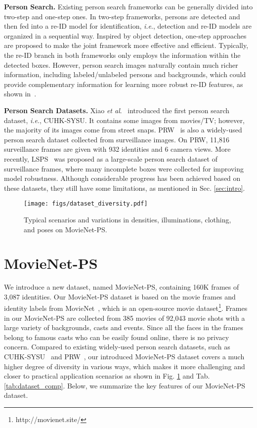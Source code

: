 \documentclass{article}
\def\ie{\emph{i.e}.} \def\Ie{\emph{I.e}.}
\def\etal{\emph{et al}.}
\begin{document}
\noindent\textbf{Person Search.}
Existing person search frameworks can be generally divided into two-step and one-step ones. In two-step frameworks, persons are detected and then fed into a re-ID model for identification, \ie, detection and re-ID models are organized in a sequential way. Inspired by object detection, one-step approaches~\cite{OIM,Yan2021AnchorFreePS,SeqNet,NAE,KD_PS,Kim_2021_CVPR} are proposed to make the joint framework more effective and efficient.
Typically, the re-ID branch in both frameworks only employs the information within the detected boxes. However, person search images naturally contain much richer information, including labeled/unlabeled persons and backgrounds, which could provide complementary information for learning more robust re-ID features, as shown in~\cite{Han_2021_ICCV, Yan2021ExploringVC}.


\noindent\textbf{Person Search Datasets.}
Xiao \etal~\cite{OIM} introduced the first person search dataset, \ie, CUHK-SYSU. It contains some images from movies/TV; however, the majority of its images come from street snaps.
PRW~\cite{PRW} is also a widely-used person search dataset collected from surveillance images.
On PRW, 11,816 surveillance frames are given with 932 identities and 6 camera views. More recently, LSPS~\cite{LSPS} was proposed as a large-scale person search dataset of surveillance frames, where many incomplete boxes were collected for improving model robustness. Although considerable progress has been achieved based on these datasets, they still have some limitations, as mentioned in Sec. \ref{sec:intro}.


\begin{figure}[!t]
  \centering
\texttt{[image: figs/dataset\_diversity.pdf]}
   \vspace{-4mm}
   \caption{Typical scenarios and variations in densities, illuminations, clothing, and poses on MovieNet-PS.}
   \vspace{-4mm}
   \label{fig:dataset_diversity}
\end{figure}
\section{MovieNet-PS}
\label{sec:dataset}



We introduce a new dataset, named MovieNet-PS, containing 160K frames of 3,087 identities. Our MovieNet-PS dataset is based on the movie frames and identity labels from MovieNet~\cite{MovieNet}, which is an open-source movie dataset\footnote{http://movienet.site/}. Frames in our MovieNet-PS are collected from 385 movies of 92,043 movie shots with a large variety of backgrounds, casts and events. Since all the faces in the frames belong to famous casts who can be easily found online, there is no privacy concern. Compared to existing widely-used person search datasets, such as CUHK-SYSU~\cite{OIM} and PRW~\cite{PRW}, our introduced MovieNet-PS dataset covers a much higher degree of diversity in various ways, which makes it more challenging and closer to practical application scenarios as shown in Fig. \ref{fig:dataset_diversity} and Tab. \ref{tab:dataset_comp}. Below, we summarize the key features of our MovieNet-PS dataset.
\end{document}

